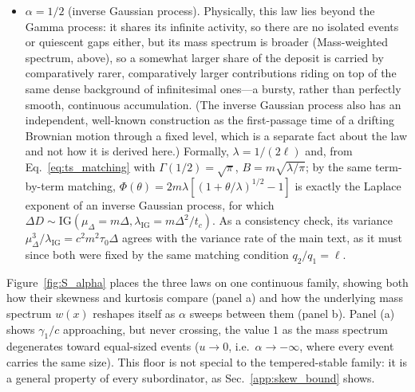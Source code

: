 \documentclass[preprint,12pt]{elsarticle}
\begin{document}
\begin{itemize}
    pointed to, and no stretch of time is ever truly flat. The record
    still only ever increases (deposition cannot run backward), but it does
    so through an uninterrupted accumulation of infinitesimal contributions
    rather than through discrete, separately identifiable arrivals.
    Formally, $\lambda=1/\ell$ and $B=m\lambda$;
    the activity is infinite ($0\le\alpha<1$), so there is no finite list of
    discrete events to thin or enumerate---the process deposits through a
    dense set of arbitrarily small jumps rather than a countable sequence of
    them, which is the precise sense of ``continuous rain'' above. Even so, $\Phi(\theta)=m\lambda\ln(1+\theta/\lambda)$,
    Eq.~\eqref{eq:ts_laplace_exponent_gamma}, is exactly the Laplace
    exponent of a Gamma process of shape rate $B$ and scale $1/\lambda$,
    for which $\Delta D\sim\mathrm{Gamma}(\mathrm{shape}=B\Delta,\mathrm{scale}=1/\lambda)$:
    the match is read off by comparing this expression term by term against
    the textbook Laplace exponent of a Gamma process. Since $B\Delta=m\Delta/\ell=\Delta/t_c$ and $1/\lambda=\ell$, this is
    $\Delta D\sim\mathrm{Gamma}(\mathrm{shape}=\Delta/t_c,\ \mathrm{scale}=\ell)$.
  \item $\alpha=1/2$ (inverse Gaussian process). Physically, this law lies
    beyond the Gamma process: it shares its infinite activity,
    so there are no isolated events or quiescent gaps either, but its mass
    spectrum is broader (Mass-weighted spectrum, above), so a somewhat
    larger share of the deposit is carried by comparatively rarer,
    comparatively larger contributions riding on top of the same dense
    background of infinitesimal ones---a bursty, rather than perfectly
    smooth, continuous accumulation. (The inverse Gaussian process also has
    an independent, well-known construction as the first-passage time of a
    drifting Brownian motion through a fixed level, which is a separate
    fact about the law and not how it is derived here.) Formally,
    $\lambda=1/(2\ell)$
    and, from Eq.~\eqref{eq:ts_matching} with $\Gamma(1/2)=\sqrt\pi$,
    $B=m\sqrt{\lambda/\pi}$; by the same term-by-term matching,
    $\Phi(\theta)=2m\lambda[(1+\theta/\lambda)^{1/2}-1]$
    is exactly the Laplace exponent of an inverse Gaussian process, for
    which $\Delta D\sim\mathrm{IG}(\mu_\Delta=m\Delta,\lambda_{\mathrm{IG}}=m\Delta^2/t_c)$.
    As a consistency check, its variance $\mu_\Delta^3/\lambda_{\mathrm{IG}}=c^2m^2\tau_0\Delta$
    agrees with the variance rate of the main text, as it must since both
    were fixed by the same matching condition $q_2/q_1=\ell$.
\end{itemize}
Figure~\ref{fig:S_alpha} places the three
laws on one continuous family, showing both how their skewness and
kurtosis compare (panel a) and how the underlying mass spectrum $w(x)$
reshapes itself as $\alpha$ sweeps between them (panel b). Panel (a) shows
$\gamma_1/c$ approaching, but never crossing, the value $1$ as the mass
spectrum degenerates toward equal-sized events ($u\to0$, i.e.\
$\alpha\to-\infty$, where every event carries the same size). This
floor is not special to the tempered-stable family: it is a general
property of every subordinator, as Sec.~\ref{app:skew_bound} shows.
\end{document}
